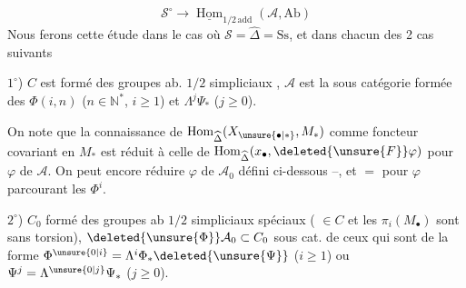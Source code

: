 \[
 \mathscr S^\circ\longrightarrow\underline{\operatorname{Hom}}_{1/2\,\mathrm{add}}(\mathcal A,\mathrm{Ab})
\]
Nous ferons cette étude dans le
cas où $\mathscr S=\widehat\Delta=\mathrm{Ss}$, et dans
chacun des 2 cas suivants

$1^\circ$) $C$ est formé des groupes ab. $1/2$ simpliciaux
, $\mathcal A$ est la
sous catégorie formée des
$\Phi(i,n)$ ($n\in\mathbb N^*$,  $i\geq1$) et $\Lambda^j\Psi_*$ ($j\geq0$).

On note que  la connaissance de
$\operatorname{Hom}_{\widehat\Delta}(X_{\unsure{\bullet|*}},M_*)$ comme foncteur
covariant en $M_*$ est réduit à
celle de $\operatorname{Hom}_{\widehat\Delta}(x_{\bullet},\deleted{\unsure{F}}\varphi)$ pour
$\varphi$ de $\mathcal A$. On peut encore
réduire  $\varphi$ de $\mathcal A_0$ défini
ci-dessous --, et $=$ pour $\varphi$ parcourant
les $\Phi^i$.

$2^\circ$) $C_0$   formé \unsure{:} des groupes ab
$1/2$ simpliciaux  spéciaux
( $\in C$ et les $\pi_i(M_{\bullet})$ sont
sans torsion), $\deleted{\unsure{\Phi}}\mathcal A_0\subset C_0$ sous cat.
de ceux qui sont de la forme
$\Phi^{\unsure{0|i}}=\Lambda^i\Phi_*\deleted{\unsure{\Psi}}$ ($i\geq1$) ou $\Psi^j=\Lambda^{\unsure{0|j}}\Psi_*$ ($j\geq0$).
